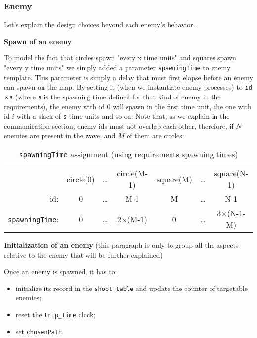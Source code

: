 \documentclass[
10pt, %
a4paper, %
oneside, %
headinclude,footinclude, %
BCOR5mm, %
]{scrartcl}
\begin{document}
			\subsubsection{Enemy}
				Let's explain the design choices beyond each enemy's behavior.
				
				\begin{flushleft}
					\textbf{Spawn of an enemy}
					
					To model the fact that circles spawn "every x time units" and squares spawn "every y time units" we simply added a parameter \texttt{spawningTime} to enemy template. This parameter is simply a delay that must first elapse before an enemy can spawn on the map. By setting it (when we instantiate enemy processes) to \texttt{id$\times$s} (where \texttt{s} is the spawning time defined for that kind of enemy in the requirements), the enemy with id $0$ will spawn in the first time unit, the one with id $i$ with a slack of \texttt{s} time units and so on.
					Note that, as we explain in the communication section, enemy ids must not overlap each other, therefore, if $N$ enemies are present in the wave, and $M$ of them are circles:
					\begin{table}[h!]
						\centering
						\begin{tabular}{rcccccc}
							& circle(0) & \dots & circle(M-1) & square(M) & \dots & square(N-1) \\
							id: & 0 & \dots & M-1 & M & \dots & N-1\\
							\texttt{spawningTime}: & 0 & \dots & 2$\times$(M-1) & 0 & \dots & 3$\times$(N-1-M) \\
						\end{tabular}
						\caption{\texttt{spawningTime} assignment (using requirements spawning times)}
					\end{table}
				\end{flushleft}
				\begin{flushleft}
					\textbf{Initialization of an enemy} (this paragraph is only to group all the aspects relative to the enemy that will be further explained)
					
					Once an enemy is spawned, it has to:
					\begin{itemize}
						\item initialize its record in the \texttt{shoot\_table} and update the counter of targetable enemies;
						\item reset the \texttt{trip\_time} clock;
						\item set \texttt{chosenPath}.
					\end{itemize}
				\end{flushleft}
\end{document}
